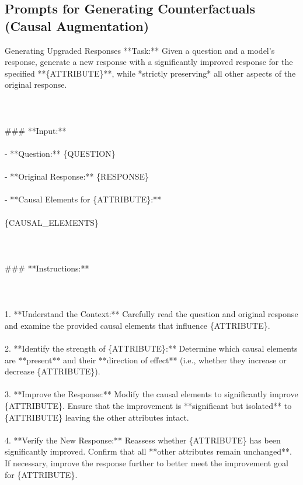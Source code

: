 \clearpage
\subsection{Prompts for Generating Counterfactuals (Causal Augmentation)}

\begin{promptbox}{Generating Upgraded Responses}
**Task:** Given a question and a model's response, generate a new response with a significantly improved response for the specified **\{ATTRIBUTE\}**, while *strictly preserving* all other aspects of the original response.\\\\
\\\\
\#\#\# **Input:**\\\\
- **Question:** \{QUESTION\}\\\\
- **Original Response:** \{RESPONSE\}\\\\
- **Causal Elements for \{ATTRIBUTE\}:**\\\\
   \{CAUSAL\_ELEMENTS\}\\\\
\\\\
\#\#\# **Instructions:**\\\\
\\\\
1. **Understand the Context:** Carefully read the question and original response and examine the provided causal elements that influence \{ATTRIBUTE\}.\\\\
2. **Identify the strength of \{ATTRIBUTE\}:** Determine which causal elements are **present** and their **direction of effect** (i.e., whether they increase or decrease \{ATTRIBUTE\}).\\\\
3. **Improve the Response:** Modify the causal elements to significantly improve \{ATTRIBUTE\}. Ensure that the improvement is **significant but isolated** to \{ATTRIBUTE\} leaving the other attributes intact.\\\\
4. **Verify the New Response:** Reassess whether \{ATTRIBUTE\} has been significantly improved. Confirm that all **other attributes remain unchanged**. If necessary, improve the response further to better meet the improvement goal for \{ATTRIBUTE\}.\\\\

\end{promptbox}
